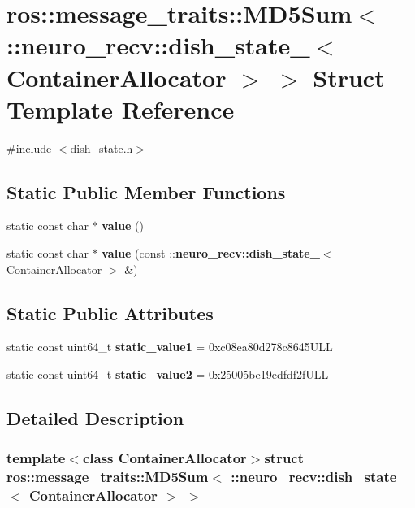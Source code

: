 \section{ros\-:\-:message\-\_\-traits\-:\-:\-M\-D5\-Sum$<$ \-:\-:neuro\-\_\-recv\-:\-:dish\-\_\-state\-\_\-$<$ \-Container\-Allocator $>$ $>$ \-Struct \-Template \-Reference}
\label{structros_1_1message__traits_1_1MD5Sum_3_01_1_1neuro__recv_1_1dish__state___3_01ContainerAllocator_01_4_01_4}


{\ttfamily \#include $<$dish\-\_\-state.\-h$>$}

\subsection*{\-Static \-Public \-Member \-Functions}
\begin{DoxyCompactItemize}
\item 
static const char $\ast$ {\bf value} ()
\item 
static const char $\ast$ {\bf value} (const \-::{\bf neuro\-\_\-recv\-::dish\-\_\-state\-\_\-}$<$ \-Container\-Allocator $>$ \&)
\end{DoxyCompactItemize}
\subsection*{\-Static \-Public \-Attributes}
\begin{DoxyCompactItemize}
\item 
static const uint64\-\_\-t {\bf static\-\_\-value1} = 0xc08ea80d278c8645\-U\-L\-L
\item 
static const uint64\-\_\-t {\bf static\-\_\-value2} = 0x25005be19edfdf2f\-U\-L\-L
\end{DoxyCompactItemize}


\subsection{\-Detailed \-Description}
\subsubsection*{template$<$class Container\-Allocator$>$struct ros\-::message\-\_\-traits\-::\-M\-D5\-Sum$<$ \-::neuro\-\_\-recv\-::dish\-\_\-state\-\_\-$<$ Container\-Allocator $>$ $>$}



